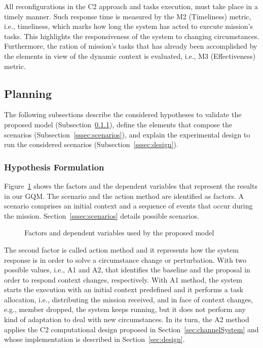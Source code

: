 All reconfigurations in the C2 approach and tasks execution, must take place in a timely manner. Such response time is measured by the M2 (Timeliness) metric, i.e., timeliness, which marks how long the system has acted to execute mission's tasks. This highlights the responsiveness of the system to changing circumstances. Furthermore, the ration of mission's tasks that has already been accomplished by the elements in view of the dynamic context is evaluated, i.e., M3 (Effectiveness) metric.

\subsection{Planning}
\label{ssec:planning}

The following subsections describe the considered hypotheses to validate the proposed model (Subsection~\ref{sssec:hyp}), define the elements that compose the scenarios (Subsection~\ref{sssec:scenarios}), and explain the experimental design to run the considered scenarios (Subsection~\ref{sssec:design}).

\subsubsection{Hypothesis Formulation}
\label{sssec:hyp}

Figure~\ref{fig:variables} shows the factors and the dependent variables that represent the results in our GQM. The scenario and the action method are identified as factors. A scenario comprises an initial context and a sequence of events that occur during the mission. Section~\ref{sssec:scenarios} details possible scenarios.

\begin{figure}[ht!]
    \centering
    \scalebox{.65}{}
    \caption{Factors and dependent variables used by the proposed model}
    \label{fig:variables}
\end{figure}

The second factor is called action method and it represents how the system response is in order to solve a circumstance change or perturbation. With two possible values, i.e., A1 and A2, that identifies the baseline and the proposal in order to respond context changes, respectively. With A1 method, the system starts the execution with an initial context predefined and it performs a task allocation, i.e., distributing the mission received, and in face of context changes, e.g., member dropped, the system keeps running, but it does not perform any kind of adaptation to deal with new circumstances. In its turn, the A2 method applies the C2 computational design proposed in Section~\ref{sec:channelSystem} and whose implementation is described in Section~\ref{sec:design}. 


